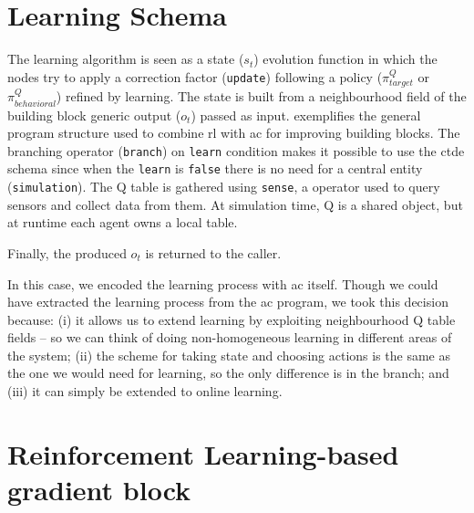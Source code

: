 \section{Learning Schema} 

The learning algorithm is seen as a state ($s_t$) evolution function in which the nodes try to apply a correction factor (\lstinline|update|) following a policy ($\pi^Q_{target}$ or $\pi^Q_{behavioral}$) refined by learning.
%
The state is built from a neighbourhood field of the building block generic output ($o_t$) passed as input.
%
 exemplifies the general program structure used to combine \ac{rl} with \ac{ac} for improving building blocks.
%
The branching operator (\lstinline|branch|) on \lstinline|learn| condition makes it possible to use the \ac{ctde} schema since when the \lstinline|learn| is \lstinline|false| there is no need for a central entity (\lstinline|simulation|).
%
The Q table is gathered using \lstinline|sense|, a \scafi{} operator used to query sensors and collect data from them. 
%
At simulation time, Q is a shared object, but at runtime each agent owns a local table.
%

%
Finally, the produced $o_{t}$ is returned to the caller.

In this case, we encoded the learning process with \ac{ac} itself. 
%
Though we could have extracted the learning process from the \ac{ac} program, %
 we took this decision because: 
  (i) it allows us to extend learning by exploiting neighbourhood Q table fields -- so we can think of doing non-homogeneous learning in different areas of the system;
  (ii) the scheme for taking state and choosing actions is the same as the one we would need for learning, so the only difference is in the branch; and
  (iii) it can simply be extended to online learning.
%

\section{Reinforcement Learning-based gradient block}

